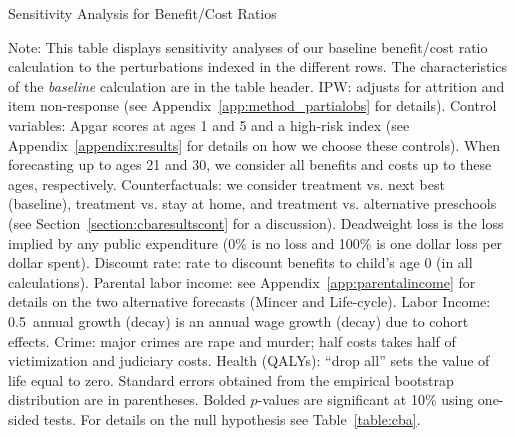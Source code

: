 \begin{table}
\begin{threeparttable}
\caption{Sensitivity Analysis for Benefit/Cost Ratios}
\label{table:bcsens}
\centering
\scriptsize

\begin{tablenotes}
\scriptsize
\item Note: This table displays sensitivity analyses of our baseline benefit/cost ratio calculation to the perturbations indexed in the different rows. The characteristics of the \textit{baseline} calculation are in the table header. IPW: adjusts for attrition and item non-response (see  Appendix~\ref{app:method_partialobs} for details). Control variables: Apgar scores at ages 1 and 5 and a high-risk index (see  Appendix~\ref{appendix:results} for details on how we choose these controls). When forecasting up to ages 21 and 30, we consider all benefits and costs up to these ages, respectively. Counterfactuals: we consider treatment vs. next best (baseline), treatment vs. stay at home, and treatment vs. alternative preschools (see Section~\ref{section:cbaresultscont} for a discussion). Deadweight loss is the loss implied by any public expenditure (0\% is no loss and 100\% is one dollar loss per dollar spent). Discount rate: rate to discount benefits to child's age 0 (in all calculations). Parental labor income: see  Appendix~\ref{app:parentalincome} for details on the two alternative forecasts (Mincer and Life-cycle). Labor Income: 0.5\ annual growth (decay) is an annual wage growth (decay) due to cohort effects. Crime: major crimes are rape and murder; half costs takes half of victimization and judiciary costs. Health (QALYs): ``drop all'' sets the value of life equal to zero. Standard errors obtained from the empirical bootstrap distribution are in parentheses. Bolded $p$-values are significant at 10\% using one-sided tests. For details on the null hypothesis see Table~\ref{table:cba}.
\end{tablenotes}
\end{threeparttable}
\end{table}

